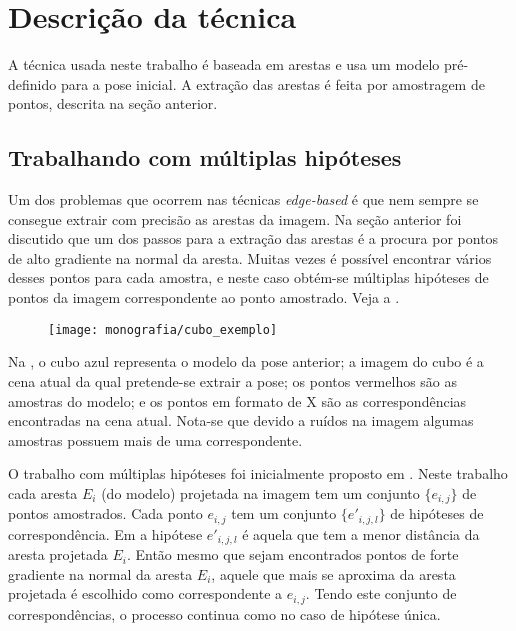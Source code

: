 \chapter{Descrição da técnica}

A técnica usada neste trabalho é baseada em arestas e usa um modelo pré-definido para a pose inicial. A extração das arestas é feita por amostragem de pontos, descrita na seção anterior.

\section{Trabalhando com múltiplas hipóteses}

Um dos problemas que ocorrem nas técnicas \emph{edge-based} é que nem sempre se consegue extrair com precisão as arestas da imagem. Na seção anterior foi discutido que um dos passos para a extração das arestas é a procura por pontos de alto gradiente na normal da aresta. Muitas vezes é possível encontrar vários desses pontos para cada amostra, e neste caso obtém-se múltiplas hipóteses de pontos da imagem correspondente ao ponto amostrado. Veja a .



\begin{figure}[ht!]
\centering
\texttt{[image: monografia/cubo\_exemplo]}
\caption{}
\label{cubo_0}
\end{figure}

Na , o cubo azul representa o modelo da pose anterior; a imagem do cubo é a cena atual da qual pretende-se extrair a pose; os pontos vermelhos são as amostras do modelo; e os pontos em formato de X são as correspondências encontradas na cena atual. Nota-se que devido a ruídos na imagem algumas amostras possuem mais de uma correspondente.

O trabalho com múltiplas hipóteses foi inicialmente proposto em \cite{multiplas_hipoteses}. Neste trabalho cada aresta $E_i$ (do modelo) projetada na imagem tem um conjunto $\{e_{i,j}\}$ de pontos amostrados. Cada ponto $e_{i,j}$ tem um conjunto $\{e'_{i,j,l}\}$ de hipóteses de correspondência. Em \cite{multiplas_hipoteses} a hipótese $e'_{i,j,l}$ é aquela que tem a menor distância da aresta projetada $E_i$. Então mesmo que sejam encontrados pontos de forte gradiente na normal da aresta $E_i$, aquele que mais se aproxima da aresta projetada é escolhido como correspondente a $e_{i,j}$. Tendo este conjunto de correspondências, o processo continua como no caso de hipótese única.

